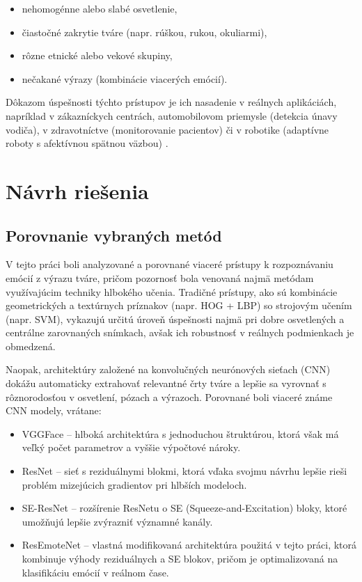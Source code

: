 \begin{itemize}
    \item nehomogénne alebo slabé osvetlenie,
    \item čiastočné zakrytie tváre (napr. rúškou, rukou, okuliarmi),
    \item rôzne etnické alebo vekové skupiny,
    \item nečakané výrazy (kombinácie viacerých emócií).
\end{itemize}

Dôkazom úspešnosti týchto prístupov je ich nasadenie v reálnych aplikáciách, napríklad v zákazníckych centrách, automobilovom priemysle (detekcia únavy vodiča), v zdravotníctve (monitorovanie pacientov) či v robotike (adaptívne roboty s afektívnou spätnou väzbou) \cite{inProceedings01}.


\section{Návrh riešenia}        %
\label{sec:solution_design}
\subsection{Porovnanie vybraných metód}
V tejto práci boli analyzované a porovnané viaceré prístupy k rozpoznávaniu emócií z výrazu tváre, pričom pozornosť bola venovaná najmä metódam využívajúcim techniky hlbokého učenia. Tradičné prístupy, ako sú kombinácie geometrických a textúrnych príznakov (napr. HOG + LBP) so strojovým učením (napr. SVM), vykazujú určitú úroveň úspešnosti najmä pri dobre osvetlených a centrálne zarovnaných snímkach, avšak ich robustnosť v reálnych podmienkach je obmedzená.

Naopak, architektúry založené na konvolučných neurónových sieťach (CNN) dokážu automaticky extrahovať relevantné črty tváre a lepšie sa vyrovnať s rôznorodosťou v osvetlení, pózach a výrazoch. Porovnané boli viaceré známe CNN modely, vrátane:
\begin{itemize}
    \item VGGFace – hlboká architektúra s jednoduchou štruktúrou, ktorá však má veľký počet parametrov a vyššie výpočtové nároky.
    \item ResNet – sieť s reziduálnymi blokmi, ktorá vďaka svojmu návrhu lepšie rieši problém mizejúcich gradientov pri hlbších modeloch.
    \item SE-ResNet – rozšírenie ResNetu o SE (Squeeze-and-Excitation) bloky, ktoré umožňujú lepšie zvýrazniť významné kanály.
    \item ResEmoteNet – vlastná modifikovaná architektúra použitá v tejto práci, ktorá kombinuje výhody reziduálnych a SE blokov, pričom je optimalizovaná na klasifikáciu emócií v reálnom čase.
\end{itemize}

